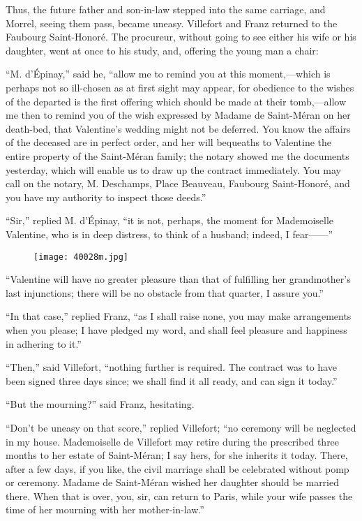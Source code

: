 Thus, the future father and son-in-law stepped into the same carriage,
and Morrel, seeing them pass, became uneasy. Villefort and Franz
returned to the Faubourg Saint-Honoré. The procureur, without going to
see either his wife or his daughter, went at once to his study, and,
offering the young man a chair:

“M. d’Épinay,” said he, “allow me to remind you at this moment,—which
is perhaps not so ill-chosen as at first sight may appear, for
obedience to the wishes of the departed is the first offering which
should be made at their tomb,—allow me then to remind you of the wish
expressed by Madame de Saint-Méran on her death-bed, that Valentine’s
wedding might not be deferred. You know the affairs of the deceased are
in perfect order, and her will bequeaths to Valentine the entire
property of the Saint-Méran family; the notary showed me the documents
yesterday, which will enable us to draw up the contract immediately.
You may call on the notary, M. Deschamps, Place Beauveau, Faubourg
Saint-Honoré, and you have my authority to inspect those deeds.”

“Sir,” replied M. d’Épinay, “it is not, perhaps, the moment for
Mademoiselle Valentine, who is in deep distress, to think of a husband;
indeed, I fear——”

\begin{figure}[ht]
\texttt{[image: 40028m.jpg]}
\end{figure}

“Valentine will have no greater pleasure than that of fulfilling her
grandmother’s last injunctions; there will be no obstacle from that
quarter, I assure you.”

“In that case,” replied Franz, “as I shall raise none, you may make
arrangements when you please; I have pledged my word, and shall feel
pleasure and happiness in adhering to it.”

“Then,” said Villefort, “nothing further is required. The contract was
to have been signed three days since; we shall find it all ready, and
can sign it today.”

“But the mourning?” said Franz, hesitating.

“Don’t be uneasy on that score,” replied Villefort; “no ceremony will
be neglected in my house. Mademoiselle de Villefort may retire during
the prescribed three months to her estate of Saint-Méran; I say hers,
for she inherits it today. There, after a few days, if you like, the
civil marriage shall be celebrated without pomp or ceremony. Madame de
Saint-Méran wished her daughter should be married there. When that is
over, you, sir, can return to Paris, while your wife passes the time of
her mourning with her mother-in-law.”

